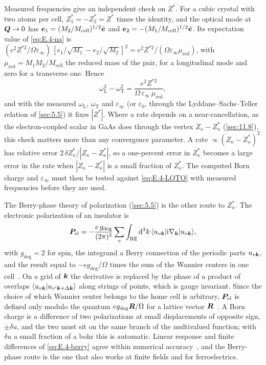 Measured frequencies give an independent check on $Z^*$. For a cubic crystal with two atoms per cell, $Z^*_1 = -Z^*_2 = Z^*$ times the identity, and the optical mode at $\bm{Q}\to0$ has $\bm{e}_{1} = (M_2/M_{\mathrm{cell}})^{1/2}\hat{\bm{e}}$ and $\bm{e}_{2} = -(M_1/M_{\mathrm{cell}})^{1/2}\hat{\bm{e}}$. Its expectation value of \cref{eq:E.4-na} is $(e^2Z^{*2}/\Omega\varepsilon_\infty)\,[e_1/\sqrt{M_1} - e_2/\sqrt{M_2}]^2 = e^2Z^{*2}/(\Omega\varepsilon_\infty\mu_{\mathrm{red}})$, with $\mu_{\mathrm{red}} = M_1M_2/M_{\mathrm{cell}}$ the reduced mass of the pair, for a longitudinal mode and zero for a transverse one. Hence
\begin{equation}
  \omega_{\mathrm{L}}^2 - \omega_{\mathrm{T}}^2 = \frac{e^2Z^{*2}}{\Omega\,\varepsilon_\infty\,\mu_{\mathrm{red}}} ,
  \label{eq:E.4-LOTO}
\end{equation}
and with the measured $\omega_{\mathrm{L}}$, $\omega_{\mathrm{T}}$ and $\varepsilon_\infty$ (or $\varepsilon_0$, through the Lyddane--Sachs--Teller relation of \cref{sec:5.5}) it fixes $|Z^*|$. Where a rate depends on a near-cancellation, as the electron-coupled scalar in GaAs does through the vertex $Z_\kappa - Z^*_\kappa$ (\cref{sec:11.8}), this check matters more than any convergence parameter. A rate $\propto (Z_\kappa - Z^*_\kappa)^2$ has relative error $2\,\delta Z^*_\kappa/|Z_\kappa - Z^*_\kappa|$, so a one-percent error in $Z^*_\kappa$ becomes a large error in the rate when $|Z_\kappa - Z^*_\kappa|$ is a small fraction of $Z^*_\kappa$. The computed Born charge and $\varepsilon_\infty$ must then be tested against \cref{eq:E.4-LOTO} with measured frequencies before they are used.

The Berry-phase theory of polarization (\cref{sec:5.5}) is the other route to $Z^*_\kappa$. The electronic polarization of an insulator is
\begin{equation}
  \bm{P}_{\mathrm{el}} = -\frac{e\,g_{\mathrm{deg}}}{(2\pi)^3}\sum_{v}\int_{\mathrm{BZ}}\mathrm{d}^3k\,\langle u_{v\bm{k}}|\mathrm{i}\nabla_{\bm{k}}|u_{v\bm{k}}\rangle ,
  \label{eq:E.4-berry}
\end{equation}
with $g_{\mathrm{deg}} = 2$ for spin, the integrand a Berry connection of the periodic parts $u_{v\bm{k}}$, and the result equal to $-e g_{\mathrm{deg}}/\Omega$ times the sum of the Wannier centers in one cell~\cite[Eqs.~(89)--(90)]{marzari2012maximally}. On a grid of $\bm{k}$ the derivative is replaced by the phase of a product of overlaps $\langle u_{v\bm{k}}|u_{v'\bm{k}+\Delta\bm{k}}\rangle$ along strings of points, which is gauge invariant. Since the choice of which Wannier center belongs to the home cell is arbitrary, $\bm{P}_{\mathrm{el}}$ is defined only modulo the quantum $e g_{\mathrm{deg}}\bm{R}/\Omega$ for a lattice vector $\bm{R}$~\cite[Sect.~V.A.1]{marzari2012maximally}. A Born charge is a difference of two polarizations at small displacements of opposite sign, $\pm\delta u$, and the two must sit on the same branch of the multivalued function; with $\delta u$ a small fraction of a bohr this is automatic. Linear response and finite differences of \cref{eq:E.4-berry} agree within numerical accuracy~\cite[Sect.~II.D.2]{baroni2001phonons}, and the Berry-phase route is the one that also works at finite fields and for ferroelectrics.


